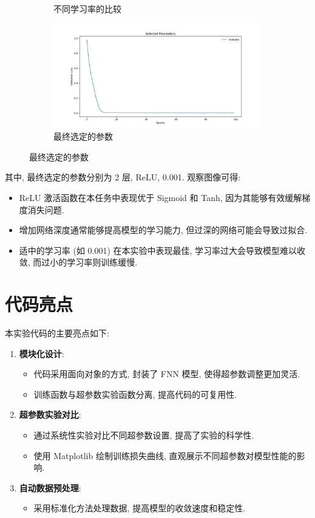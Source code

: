 \documentclass{article}
\begin{document}
\begin{figure}[htbp]
\begin{subfigure}[b]{0.45\textwidth}
				\caption{不同学习率的比较}
			\end{subfigure}
			\begin{subfigure}[b]{0.45\textwidth}
				\includegraphics[width=\textwidth]{figure/selected_parameters.png}
				\caption{最终选定的参数}
			\end{subfigure}
		\end{figure}

		其中, 最终选定的参数分别为 2 层, ReLU, 0.001. 观察图像可得:

		\begin{itemize}
			\item ReLU 激活函数在本任务中表现优于 Sigmoid 和 Tanh, 因为其能够有效缓解梯度消失问题.
			\item 增加网络深度通常能够提高模型的学习能力, 但过深的网络可能会导致过拟合.
			\item 适中的学习率 (如 0.001) 在本实验中表现最佳, 学习率过大会导致模型难以收敛, 而过小的学习率则训练缓慢.
		\end{itemize}

	\section{代码亮点}
		本实验代码的主要亮点如下:

		\begin{enumerate}
			\item \textbf{模块化设计}:
				\begin{itemize}
					\item 代码采用面向对象的方式, 封装了 FNN 模型, 使得超参数调整更加灵活.
					\item 训练函数与超参数实验函数分离, 提高代码的可复用性.
				\end{itemize}
			\item \textbf{超参数实验对比}:
				\begin{itemize}
					\item 通过系统性实验对比不同超参数设置, 提高了实验的科学性.
					\item 使用 Matplotlib 绘制训练损失曲线, 直观展示不同超参数对模型性能的影响.
				\end{itemize}
			\item \textbf{自动数据预处理}:
				\begin{itemize}
					\item 采用标准化方法处理数据, 提高模型的收敛速度和稳定性.
				\end{itemize}
		\end{enumerate}
\end{document}
